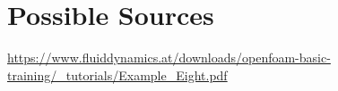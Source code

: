 \pagebreak
\section{Possible Sources}
\url{https://www.fluiddynamics.at/downloads/openfoam-basic-training/_tutorials/Example_Eight.pdf}
